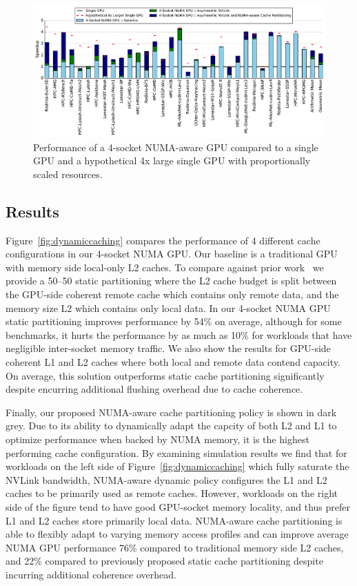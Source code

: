\begin{figure}[tp]
    \centering
    \includegraphics[width=1.0\textwidth]{figures/plot_final_speedup_WB_nvlink_first.pdf}
    \caption{Performance of a 4-socket NUMA-aware GPU compared to a single GPU and a hypothetical 4x large single GPU with proportionally scaled resources.}
    \label{fig:combined}
    \vspace{-.2in}
\end{figure}



\subsection{Results}

Figure~\ref{fig:dynamiccaching} compares the performance of 4 different cache
configurations in our 4-socket NUMA GPU. Our baseline is a traditional
GPU with memory side local-only L2 caches. To compare against prior work~\cite{Arunkumar2017} we
provide a 50--50 static partitioning where the L2 cache budget is split between the 
GPU-side coherent remote cache which contains only 
remote data, and the memory size L2 which contains only local data. In our 4-socket NUMA
GPU static partitioning improves performance by 54\% on average, although for some benchmarks, 
it hurts the performance by as much as 10\% for workloads that have negligible
inter-socket memory traffic. We also show the results for GPU-side
coherent L1 and L2 caches where both local and remote data contend capacity.
On average, this solution outperforms static cache partitioning significantly
despite encurring additional flushing overhead due to cache coherence.

Finally, our proposed NUMA-aware cache 
partitioning policy is shown in dark grey. Due to its ability to
dynamically adapt the capcity of both L2 and L1 to optimize performance when backed
by NUMA memory, it is the highest performing cache configuration. By examining
simulation results we find that for workloads on the left side of Figure~\ref{fig:dynamiccaching} 
which fully saturate the NVLink bandwidth, NUMA-aware dynamic policy configures the L1 and 
L2 caches to be primarily used as remote caches.  However, workloads on the right 
side of the figure tend to have good GPU-socket memory locality, and thus 
prefer L1 and L2 caches store primarily local data.  NUMA-aware cache
partitioning is able to flexibly adapt to varying memory access profiles and
can improve average NUMA GPU performance 76\% compared to traditional memory side L2
caches, and 22\% compared to previously proposed static cache partitioning despite
incurring additional coherence overhead.

